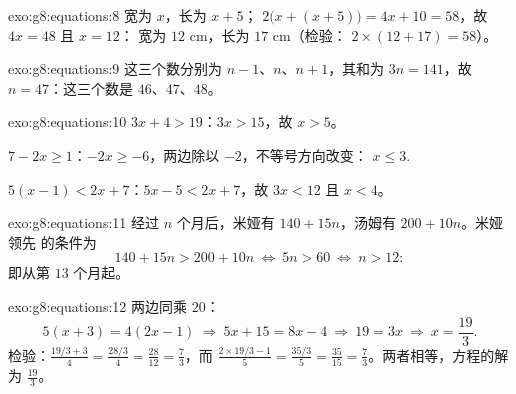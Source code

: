 \begin{solution}{exo:g8:equations:8}
宽为 $x$，长为 $x + 5$； 
$2\bigl(x + (x + 5)\bigr) = 4x + 10 = 58$，故 $4x = 48$ 且 $x = 12$：
宽为 $12$ cm，长为 $17$ cm（检验：
$2 \times (12 + 17) = 58$）。
\end{solution}

\begin{solution}{exo:g8:equations:9}
这三个数分别为 $n - 1$、$n$、$n + 1$，其和为 $3n = 141$，故
$n = 47$：这三个数是 $46$、$47$、$48$。
\end{solution}

\begin{solution}{exo:g8:equations:10}
$3x + 4 > 19$：$3x > 15$，故 $x > 5$。

$7 - 2x \geq 1$：$-2x \geq -6$，两边除以 $-2$，不等号方向改变：
$x \leq 3$.

$5(x-1) < 2x + 7$：$5x - 5 < 2x + 7$，故 $3x < 12$ 且 $x < 4$。
\end{solution}

\begin{solution}{exo:g8:equations:11}
经过 $n$ 个月后，米娅有 $140 + 15n$，汤姆有 $200 + 10n$。米娅领先
的条件为
\[
140 + 15n > 200 + 10n
\ \Longleftrightarrow\
5n > 60
\ \Longleftrightarrow\
n > 12 :
\]
即从第 $13$ 个月起。
\end{solution}

\begin{solution}{exo:g8:equations:12}
两边同乘 $20$：
\[
5(x + 3) = 4(2x - 1)
\ \Longrightarrow\
5x + 15 = 8x - 4
\ \Longrightarrow\
19 = 3x
\ \Longrightarrow\
x = \frac{19}{3}.
\]
检验：$\frac{19/3 + 3}{4} = \frac{28/3}{4} = \frac{28}{12} =
\frac73$，而 $\frac{2 \times 19/3 - 1}{5} = \frac{35/3}{5} =
\frac{35}{15} = \frac73$。两者相等，方程的解为 $\frac{19}{3}$。
\end{solution}

